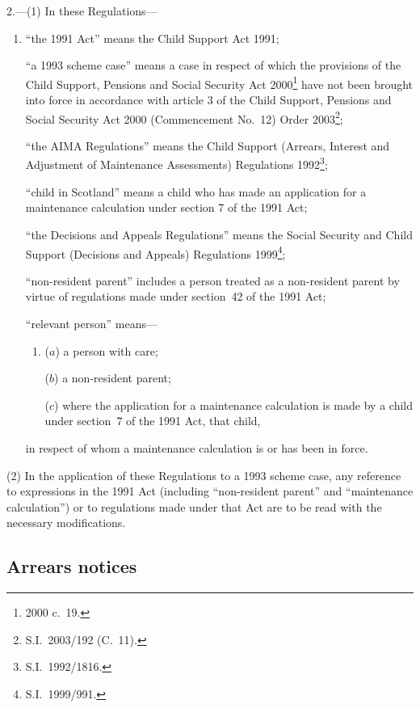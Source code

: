\documentclass[12pt,a4paper]{article}
\begin{document}
2.---(1)  In these Regulations—
\begin{enumerate}\item[]
“the 1991 Act” means the Child Support Act 1991;

“a 1993 scheme case” means a case in respect of which the provisions of the Child Support, Pensions and Social Security Act 2000\footnote{2000 c.~19.} have not been brought into force in accordance with article 3 of the Child Support, Pensions and Social Security Act 2000 (Commencement No.~12) Order 2003\footnote{S.I.~2003/192 (C.~11).};

“the AIMA Regulations” means the Child Support (Arrears, Interest and Adjustment of Maintenance Assessments) Regulations 1992\footnote{S.I.~1992/1816.};

“child in Scotland” means a child who has made an application for a maintenance calculation under section 7 of the 1991 Act;

“the Decisions and Appeals Regulations” means the Social Security and Child Support (Decisions and Appeals) Regulations 1999\footnote{S.I.~1999/991.};

“non-resident parent” includes a person treated as a non-resident parent by virtue of regulations made under section~42 of the 1991 Act;

“relevant person” means—
\begin{enumerate}\item[]
($a$) 
a person with care;

($b$) 
a non-resident parent;

($c$) 
where the application for a maintenance calculation is made by a child under section~7 of the 1991 Act, that child,
\end{enumerate}
in respect of whom a maintenance calculation is or has been in force.
\end{enumerate}

(2) In the application of these Regulations to a 1993 scheme case, any reference to expressions in the 1991 Act (including “non-resident parent” and “maintenance calculation”) or to regulations made under that Act are to be read with the necessary modifications.


\subsection[3. Arrears notices]{Arrears notices}
\end{document}
